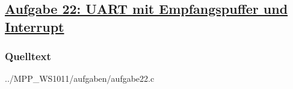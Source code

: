 \subsection*
{\href{http://cst.mi.fu-berlin.de/intern/19606-P-MPP/Aufgaben/040703.html}
{Aufgabe 22: UART mit Empfangspuffer und Interrupt}}

\subsubsection*{Quelltext}

{../MPP_WS1011/aufgaben/aufgabe22.c}
